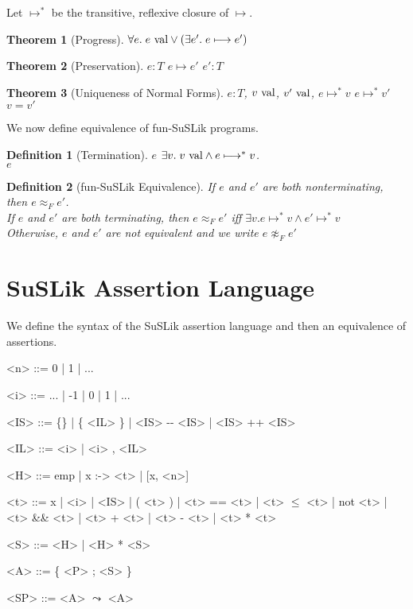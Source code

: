 \documentclass[10pt]{article}
\newtheorem{theorem}{Theorem}
\newtheorem{definition}{Definition}
\newcommand{\reduces}{\ensuremath{\longmapsto}}
\newcommand{\reducestr}{\ensuremath{\longmapsto^{*}}}
\newcommand{\val}{\textnormal{ val}}
\begin{document}
\noindent
Let $\reducestr$ be the transitive, reflexive closure of $\reduces$.

\begin{theorem}[Progress]
  $\forall e.\; e \val \lor (\exists e'.\; e \reduces e')$
\end{theorem}

\begin{theorem}[Preservation]
   $e : T$  $e \reduces e'$  $e' : T$
\end{theorem}

\begin{theorem}[Uniqueness of Normal Forms]
   $e : T$, $v \val$, $v' \val$, $e \reducestr v$  $e \reducestr v'$  $v = v'$
\end{theorem}

\noindent
We now define equivalence of fun-SuSLik programs.

\begin{definition}[Termination]
  $e$  $\exists v.\; v \val \land e \reducestr v$.\\
  $e$ 
\end{definition}

\begin{definition}[fun-SuSLik Equivalence]
  If $e$ and $e'$ are both nonterminating, then $e \approx_F e'$.\\
  If $e$ and $e'$ are both terminating, then $e \approx_F e'$ iff $\exists v. e \reducestr v \land e' \reducestr v$\\
  Otherwise, $e$ and $e'$ are not equivalent and we write $e \not\approx_F e'$
\end{definition}

\section{SuSLik Assertion Language}

We define the syntax of the SuSLik assertion language and then an equivalence of assertions.

\begin{grammar}
  <n> ::= 0 | 1 | ...

  <i> ::= ... | -1 | 0 | 1 | ...

  <IS> ::= \{\} | \{ <IL> \} | <IS> -{}- <IS> | <IS> ++ <IS>

  <IL> ::= <i> | <i> , <IL>

  <H> ::= emp | x :-> <t> | [x, <n>]

  <t> ::= x | <i> | <IS> | ( <t> ) | <t> == <t> | <t> $\le$ <t> | not <t> | <t> \&\& <t> | <t> + <t> | <t> - <t> | <t> * <t>

  <S> ::= <H> | <H> * <S>

  <A> ::= \{ <P> ; <S> \}

  <SP> ::= <A> $\leadsto$ <A>
\end{grammar}
\end{document}
